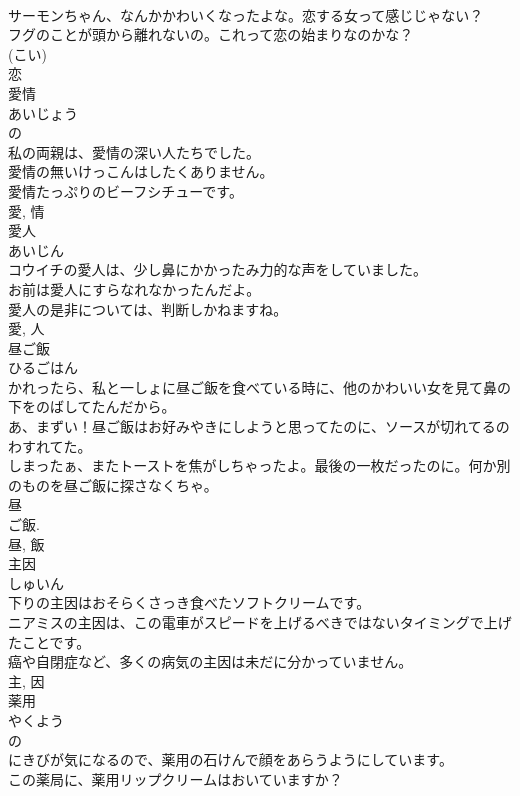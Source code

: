\documentclass[8pt]{extreport}
\begin{document}
\begin{CJK}{UTF8}{min}
\\	サーモンちゃん、なんかかわいくなったよな。恋する女って感じじゃない？	
\\	フグのことが頭から離れないの。これって恋の始まりなのかな？	
\\	(こい) 
\\	恋	
\\	愛情	
\\	あいじょう	
\\	の 
\\	私の両親は、愛情の深い人たちでした。	
\\	愛情の無いけっこんはしたくありません。	
\\	愛情たっぷりのビーフシチューです。	
\\	愛, 情	
\\	愛人	
\\	あいじん	
\\	コウイチの愛人は、少し鼻にかかったみ力的な声をしていました。	
\\	お前は愛人にすらなれなかったんだよ。	
\\	愛人の是非については、判断しかねますね。	
\\	愛, 人	
\\	昼ご飯	
\\	ひるごはん	
\\	かれったら、私と一しょに昼ご飯を食べている時に、他のかわいい女を見て鼻の下をのばしてたんだから。	
\\	あ、まずい！昼ご飯はお好みやきにしようと思ってたのに、ソースが切れてるのわすれてた。	
\\	しまったぁ、またトーストを焦がしちゃったよ。最後の一枚だったのに。何か別のものを昼ご飯に探さなくちゃ。	
\\	昼 
\\	ご飯. 
\\	昼, 飯	
\\	主因	
\\	しゅいん	
\\	下りの主因はおそらくさっき食べたソフトクリームです。	
\\	ニアミスの主因は、この電車がスピードを上げるべきではないタイミングで上げたことです。	
\\	癌や自閉症など、多くの病気の主因は未だに分かっていません。	
\\	主, 因	
\\	薬用	
\\	やくよう	
\\	の 
\\	にきびが気になるので、薬用の石けんで顔をあらうようにしています。	
\\	この薬局に、薬用リップクリームはおいていますか？	

\end{CJK}
\end{document}
